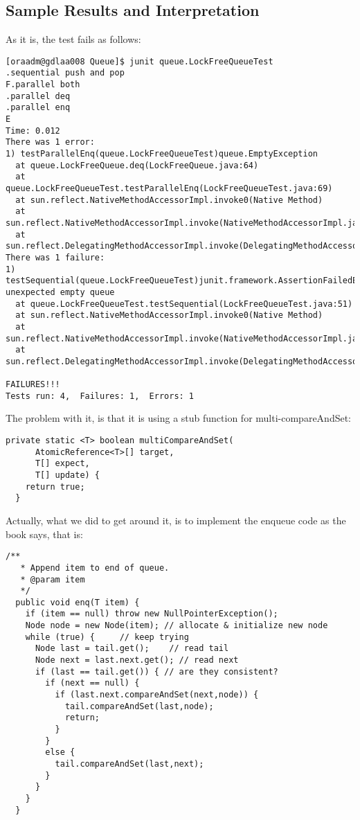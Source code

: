 \subsection{Sample Results and Interpretation}
\par
As it is, the test fails as follows:
\par
\hfill
\begin{verbatim}
[oraadm@gdlaa008 Queue]$ junit queue.LockFreeQueueTest
.sequential push and pop
F.parallel both
.parallel deq
.parallel enq
E
Time: 0.012
There was 1 error:
1) testParallelEnq(queue.LockFreeQueueTest)queue.EmptyException
  at queue.LockFreeQueue.deq(LockFreeQueue.java:64)
  at queue.LockFreeQueueTest.testParallelEnq(LockFreeQueueTest.java:69)
  at sun.reflect.NativeMethodAccessorImpl.invoke0(Native Method)
  at
sun.reflect.NativeMethodAccessorImpl.invoke(NativeMethodAccessorImpl.java:57)
  at
sun.reflect.DelegatingMethodAccessorImpl.invoke(DelegatingMethodAccessorImpl.java:43)
There was 1 failure:
1) testSequential(queue.LockFreeQueueTest)junit.framework.AssertionFailedError:
unexpected empty queue
  at queue.LockFreeQueueTest.testSequential(LockFreeQueueTest.java:51)
  at sun.reflect.NativeMethodAccessorImpl.invoke0(Native Method)
  at
sun.reflect.NativeMethodAccessorImpl.invoke(NativeMethodAccessorImpl.java:57)
  at
sun.reflect.DelegatingMethodAccessorImpl.invoke(DelegatingMethodAccessorImpl.java:43)

FAILURES!!!
Tests run: 4,  Failures: 1,  Errors: 1
\end{verbatim}
\hfill
\par
The problem with it, is that it is using a stub function for
multi-compareAndSet:
\par
\hfill
\begin{lstlisting}[style=numbers]
  private static <T> boolean multiCompareAndSet(
      AtomicReference<T>[] target,
      T[] expect,                                                                                                                                                                    
      T[] update) {
    return true;
  }
\end{lstlisting}
\hfill
\par
Actually, what we did to get around it, is to implement the enqueue code as the
book says, that is:
\hfill
\begin{lstlisting}[style=numbers]
  /**                                                                                                                                                                                
   * Append item to end of queue.
   * @param item
   */
  public void enq(T item) {
    if (item == null) throw new NullPointerException();
    Node node = new Node(item); // allocate & initialize new node
    while (true) {     // keep trying
      Node last = tail.get();    // read tail
      Node next = last.next.get(); // read next
      if (last == tail.get()) { // are they consistent?
        if (next == null) {
          if (last.next.compareAndSet(next,node)) {
            tail.compareAndSet(last,node);
            return;
          }   
        }   
        else {
          tail.compareAndSet(last,next);
        }   
      }   
    }
  }   
\end{lstlisting}
